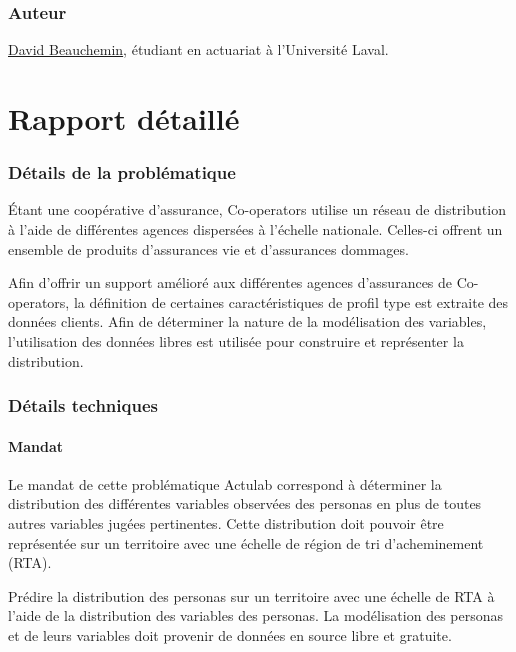 \documentclass[11pt,french]{article}\usepackage[]{graphicx}\usepackage[]{color}
\begin{document}
\section{Auteur}
\href{mailto:david.beauchemin.5@ulaval.ca}{David Beauchemin}, étudiant en actuariat à l'Université Laval.


\newpage
\part{Rapport détaillé}

\section{Détails de la problématique}

Étant une coopérative d'assurance, Co-operators utilise un réseau de distribution à l'aide de différentes agences dispersées à l'échelle nationale. Celles-ci offrent un ensemble  de produits d'assurances vie et d'assurances dommages.
\newline

Afin d'offrir un support amélioré aux différentes agences d'assurances de Co-operators, la définition de certaines caractéristiques de profil type est extraite des données clients.  Afin de déterminer la nature de la modélisation des variables, l’utilisation des données libres est utilisée pour construire et représenter la distribution.

\section{Détails techniques}

\subsection{Mandat}

Le mandat de cette problématique Actulab correspond à déterminer la distribution des différentes variables observées des personas en plus de toutes autres variables jugées pertinentes. Cette distribution doit pouvoir être représentée sur un territoire avec une échelle de région de tri d'acheminement (RTA).
\newline

Prédire la distribution des personas sur un territoire avec une échelle de RTA à l'aide de la distribution des variables des personas. La modélisation des personas et de leurs variables doit provenir de données en source libre et gratuite. 
\newline
\end{document}
